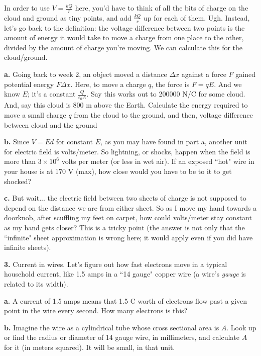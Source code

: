 \documentclass[12pt]{article}
\begin{document}
In order to use $V=\frac{kQ}{r}$ here, you'd have to think of all the bits of charge on the cloud and ground as tiny points, and add $\frac{kQ}{r}$ up for each of them. Ugh. Instead, let's go back to the definition: the voltage difference between two points is the amount of energy it would take to move a charge from one place to the other, divided by the amount of charge you're moving. We can calculate this for the cloud/ground.

\textbf{a.} Going back to week 2, an object moved a distance $\Delta x$ against a force $F$ gained potential energy $F\Delta x$. Here, to move a charge $q$, the force is $F=qE$. And we know $E$; it's a constant $\frac{Q}{\epsilon_0 A}$. Say this works out to 200000 N/C for some cloud. And, say this cloud is 800 m above the Earth. Calculate the energy required to move a small charge $q$ from the cloud to the ground, and then, voltage difference between cloud and the ground 

\textbf{b.} Since $V=Ed$ for constant $E$, as you may have found in part a, another unit for electric field is volts/meter. So lightning, or shocks,  happen when the field is more than $3 \times 10^6$ volts per meter (or less in wet air). If an exposed ``hot" wire in your house is at 170 V (max), how close would you have to be to it to get shocked?

\textbf{c.} But wait... the electric field between two sheets of charge is not supposed to depend on the distance we are from either sheet. So as I move my hand towards a doorknob, after scuffling my feet on carpet, how could volts/meter stay constant as my hand gets closer? This is a tricky point (the answer is not only that the ``infinite" sheet approximation is wrong here; it would apply even if you did have infinite sheets).

\bigskip

\textbf{3.} Current in wires. Let's figure out how fast electrons move in a typical household current, like 1.5 amps in a ``14 gauge" copper wire (a wire's \textit{gauge} is related to its width).

\textbf{a.} A current of 1.5 amps means that 1.5 C worth of electrons flow past a given point in the wire every second. How many electrons is this?

\textbf{b.} Imagine the wire as a cylindrical tube whose cross sectional area is $A$. Look up or find the radius or diameter of 14 gauge wire, in millimeters, and calculate $A$ for it (in meters squared). It will be small, in that unit.
\end{document}
